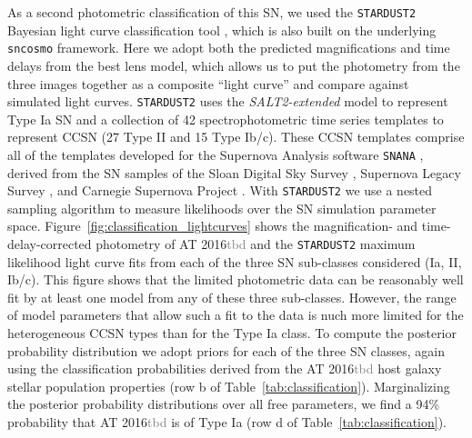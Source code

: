 \documentclass[12pt,dvipsnames]{article}
\def\SNABC{AT 2016{\textcolor{Gray}{tbd}}\xspace}
\begin{document}
As a second photometric classification of this SN, we used the {\tt STARDUST2} Bayesian light curve classification tool \cite{rodney_type_2014}, which is also built on the underlying {\tt sncosmo} framework. Here we adopt both the predicted magnifications and time delays from the best lens model, which allows us to put the photometry from the three images together as a composite ``light curve'' and compare against simulated light curves.  {\tt STARDUST2} uses the {\it SALT2-extended} model to represent Type Ia SN \cite{guy_salt2:_2007, pierel_extending_2018} and a collection of 42  spectrophotometric time series templates to represent CCSN (27 Type II and 15 Type Ib/c).  These CCSN templates comprise all of the templates developed for the Supernova Analysis software {\tt SNANA} \cite{kessler_snana:_2009}, derived from the SN samples of the Sloan Digital Sky Survey \cite{frieman_sloan_2008,sako_sloan_2008, dandrea_type_2010}, Supernova Legacy Survey \cite{astier_supernova_2006}, and Carnegie Supernova Project \cite{hamuy_carnegie_2006, stritzinger_he-rich_2009, morrell_carnegie_2012}.  With {\tt STARDUST2} we use a nested sampling algorithm to measure likelihoods over the SN simulation parameter space.  
Figure~\ref{fig:classification_lightcurves} shows the magnification- and time-delay-corrected photometry of \SNABC and the {\tt STARDUST2} maximum likelihood light curve fits from each of the three SN sub-classes considered (Ia, II, Ib/c). This figure shows that the limited photometric data can be reasonably well fit by at least one model from any of these three sub-classes. However, the range of model parameters that allow such a fit to the data is nuch more limited for the heterogeneous CCSN types than for the Type Ia class.   
To compute the posterior probability distribution we adopt priors for each of the three SN classes, again using the classification probabilities derived from the \SNABC host galaxy stellar population properties (row b of Table~\ref{tab:classification}). 
Marginalizing the posterior  probability distributions over all free parameters, we find a 94\% probability that \SNABC is of Type Ia (row d of Table~\ref{tab:classification}).  


\end{document}
